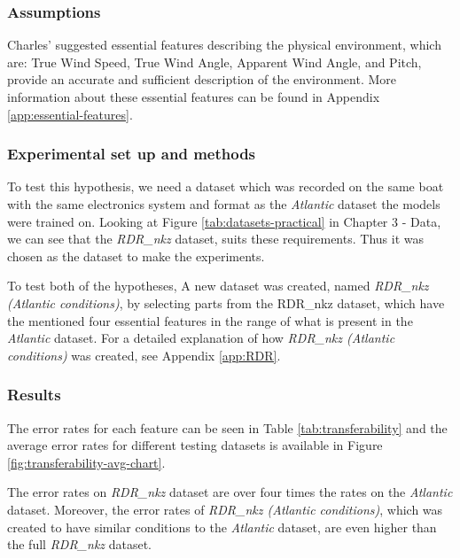 \documentclass[12pt,twoside]{report}
\begin{document}
\subsubsection{Assumptions}
Charles' suggested essential features describing the physical environment, which are: True Wind Speed, True Wind Angle, Apparent Wind Angle, and Pitch, provide an accurate and sufficient description of the environment. More information about these essential features can be found in Appendix \ref{app:essential-features}.

\subsubsection{Experimental set up and methods}
To test this hypothesis, we need a dataset which was recorded on the same boat with the same electronics system and format as the \textit{Atlantic} dataset the models were trained on. Looking at Figure \ref{tab:datasets-practical} in Chapter 3 - Data, we can see that the \textit{RDR\_nkz} dataset, suits these requirements. Thus it was chosen as the dataset to make the experiments.

To test both of the hypotheses, A new dataset was created, named \textit{RDR\_nkz (Atlantic conditions)}, by selecting parts from the RDR\_nkz dataset, which have the mentioned four essential features in the range of what is present in the \textit{Atlantic} dataset. For a detailed explanation of how \textit{RDR\_nkz (Atlantic conditions)} was created, see Appendix \ref{app:RDR}.


\subsubsection{Results}

The error rates for each feature can be seen in Table \ref{tab:transferability} and the average error rates for different testing datasets is available in Figure \ref{fig:transferability-avg-chart}.

The error rates on \textit{RDR\_nkz} dataset are over four times the rates on the \textit{Atlantic} dataset. Moreover, the error rates of \textit{RDR\_nkz (Atlantic conditions)}, which was created to have similar conditions to the \textit{Atlantic} dataset, are even higher than the full \textit{RDR\_nkz} dataset.
\end{document}
